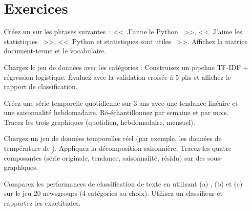 \section{Exercices}

\begin{exercice}[$\star$]
Cr\'eez un  sur les phrases suivantes~: <<~J'aime le Python ~>>, <<~J'aime les statistiques ~>>, <<~Python et statistiques sont utiles ~>>. Affichez la matrice document-terme et le vocabulaire.
\end{exercice}

\begin{exercice}[$\star\star$]
Chargez le jeu de donn\'ees  avec les cat\'egories . Construisez un pipeline TF-IDF + r\'egression logistique. \'Evaluez avec la validation crois\'ee \`a 5 plis et affichez le rapport de classification.
\end{exercice}

\begin{exercice}[$\star\star$]
Cr\'eez une s\'erie temporelle quotidienne sur 3 ans avec une tendance lin\'eaire et une saisonnalit\'e hebdomadaire. R\'e-\'echantillonnez par semaine et par mois. Tracez les trois graphiques (quotidien, hebdomadaire, mensuel).
\end{exercice}

\begin{exercice}[$\star\star\star$]
Chargez un jeu de donn\'ees temporelles r\'eel (par exemple, les donn\'ees de temp\'erature de ). Appliquez la d\'ecomposition saisonni\`ere. Tracez les quatre composantes (s\'erie originale, tendance, saisonnalit\'e, r\'esidu) sur des sous-graphiques.
\end{exercice}

\begin{exercice}[$\star\star\star$]
Comparez les performances de classification de texte en utilisant (a) , (b)  et (c)  sur le jeu 20 newsgroups (4 cat\'egories au choix). Utilisez un classifieur  et rapportez les exactitudes.
\end{exercice}


